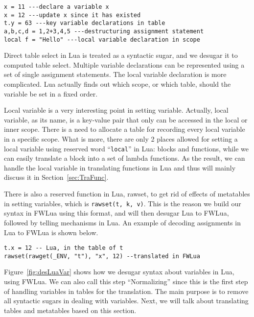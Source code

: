\begin{verbatim}
x = 11 ---declare a variable x
x = 12 ---update x since it has existed
t.y = 63 ---key variable declarations in table
a,b,c,d = 1,2+3,4,5 ---destructuring assignment statement
local f = "Hello" ---local variable declaration in scope
\end{verbatim}

Direct table select in Lua is treated as a syntactic sugar, and we desugar it to computed table select. 
Multiple variable declarations can be represented using a set of single assignment statements. 
The local variable declaration is more complicated. Lua actually finds out which scope, or which table, should the variable be set in a fixed order. 

Local variable is a very interesting point in setting variable. Actually, local variable, as its name, is a key-value pair that only can be accessed in the local or inner scope. There is a need to allocate a table for recording every local variable in a specific scope. What is more, there are only 2 places allowed for setting a local variable using reserved word ``{\tt local}'' in Lua: blocks and functions, while we can easily translate a block into a set of lambda functions. As the result, we can handle the local variable in translating functions in Lua and thus will mainly discuss it in Section~\ref{sec:TraFunc}. 

There is also a reserved function in Lua, rawset, to get rid of effects of metatables in setting variables, which is {\tt rawset(t, k, v)}. This is the reason we build our syntax in FWLua using this format, and will then desugar Lua to FWLua, followed by telling mechanisms in Lua.
An example of decoding assignments in Lua to FWLua is shown below.

\begin{verbatim}
t.x = 12 -- Lua, in the table of t
rawset(rawget(_ENV, "t"), "x", 12) --translated in FWLua
\end{verbatim}

Figure~\ref{fig:desLuaVar} shows how we desugar syntax about variables in Lua, using FWLua. We can also call this step ``Normalizing'' since this is the first step of handling variables in tables for the translation. The main purpose is to remove all syntactic sugars in dealing with variables. Next, we will talk about translating tables and metatables based on this section.

